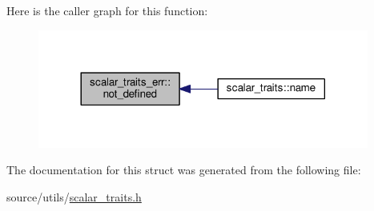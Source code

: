 Here is the caller graph for this function\-:
\nopagebreak
\begin{figure}[H]
\begin{center}
\leavevmode
\includegraphics[width=308pt]{structscalar__traits__err_ad8b64912940a767387a2b071e47c4d21_icgraph}
\end{center}
\end{figure}




The documentation for this struct was generated from the following file\-:\begin{DoxyCompactItemize}
\item 
source/utils/\hyperlink{scalar__traits_8h}{scalar\-\_\-traits.\-h}\end{DoxyCompactItemize}
